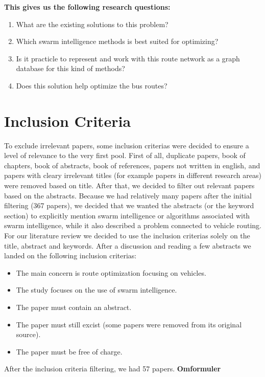 \textbf{This gives us the following research questions:}
\begin{enumerate}
\item What are the existing solutions to this problem?
\item Which swarm intelligence methods is best suited for optimizing? 
\item Is it practicle to represent and work with this route network as a graph database for this kind of methods?
\item Does this solution help optimize the bus routes? 
\end{enumerate}




\section{Inclusion Criteria}
To exclude irrelevant papers, some inclusion criterias were decided to ensure a level of relevance to the very first pool. First of all, duplicate papers, book of chapters, book of abstracts, book of references, papers not written in english, and papers with cleary irrelevant titles (for example papers in different research areas) were removed based on title. After that, we decided to filter out relevant papers based on the abstracts. Because we had relatively many papers after the initial filtering (367 papers), we decided that we wanted the abstracts (or the keyword section) to explicitly mention swarm intelligence or algorithms associated with swarm intelligence, while it also described a problem connected to vehicle routing. For our literature review we decided to use the inclusion criterias solely on the title, abstract and keywords. After a discussion and reading a few abstracts we landed on the following inclusion criterias:
\begin{itemize}
\item The main concern is route optimization focusing on vehicles. 
\item The study focuses on the use of swarm intelligence.
\item The paper must contain an abstract. 
\item The paper must still excist (some papers were removed from its original source).
\item The paper must be free of charge.
\end{itemize}

After the inclusion criteria filtering, we had 57 papers. \textbf{Omformuler}

